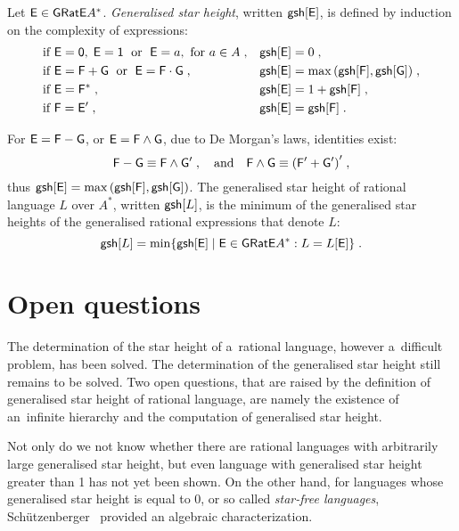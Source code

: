 \begin{defn}
    Let ${\mathsf{E}} \in {\mathsf{GRatE}} A^*$. \emph{Generalised star height}, written ${\mathsf{gs h}[{\mathsf{E}}]}$, is defined by induction on the complexity of expressions:
    \begin{align*}
        &\text{if } {\mathsf{E}} = {\mathsf{0}}, \; {\mathsf{E}} = {\mathsf{1}} \; \text{ or } \; {\mathsf{E}} = a, \text{ for } a \in A \; , & &{\mathsf{gs h}[{\mathsf{E}}]} = 0 \; , \\
        &\text{if } {\mathsf{E}} = {\mathsf{F}} + {\mathsf{G}} \; \text{ or } \; {\mathsf{E}} = {\mathsf{F}} \cdot {\mathsf{G}}\; , & &{\mathsf{gs h}[{\mathsf{E}}]} = \max{({\mathsf{gs h}[{\mathsf{F}}]}, {\mathsf{gs h}[{\mathsf{G}}]})} \; , \\
        &\text{if } {\mathsf{E}} = {\mathsf{F}}^* \; , & &{\mathsf{gs h}[{\mathsf{E}}]} = 1 + {\mathsf{gs h}[{\mathsf{F}}]} \; , \\
        &\text{if } {\mathsf{F}} = {\mathsf{E}}^{\prime} \; , & &{\mathsf{gs h}[{\mathsf{E}}]} = {\mathsf{gs h}[{\mathsf{F}}]} \; .
    \end{align*}
\end{defn}
For ${\mathsf{E}} = {\mathsf{F}} - {\mathsf{G}}$, or ${\mathsf{E}} = {\mathsf{F}} \wedge {\mathsf{G}}$, due to De Morgan's laws, identities exist:
\[
    {\mathsf{F}} - {\mathsf{G}} \equiv {\mathsf{F}} \wedge {\mathsf{G}}^{\prime} \; , \quad \text{and} \quad {\mathsf{F}} \wedge {\mathsf{G}} \equiv {({\mathsf{F}}^{\prime} + {\mathsf{G}}^{\prime})}^{\prime} \; ,
\]
thus ${\mathsf{gs h}[{\mathsf{E}}]} = \max{({\mathsf{gs h}[{\mathsf{F}}]}, {\mathsf{gs h}[{\mathsf{G}}]})}$. The generalised star height of rational language $L$ over $A^*$, written ${\mathsf{gs h}[L]}$, is the minimum of the generalised star heights of the generalised rational expressions that denote $L$:
\[
    {\mathsf{gs h}[L]} = \min \{ {\mathsf{gs h}[{\mathsf{E}}]} \mid {\mathsf{E}} \in {\mathsf{GRatE}} A^*: L = L[{\mathsf{E}}] \} \; .
\]

\section{Open questions}

The determination of the star height of a~rational language, however a~difficult problem, has been solved. The determination of the generalised star height still remains to be solved. Two open questions, that are raised by the definition of generalised star height of rational language, are namely the existence of an~infinite hierarchy and the computation of generalised star height.

Not only do we not know whether there are rational languages with arbitrarily large generalised star height, but even language with generalised star height greater than 1 has not yet been shown. On the other hand, for languages whose generalised star height is equal to 0, or so called \emph{star-free languages}, Schützenberger~\cite{Schutzenberger65} provided an algebraic characterization.